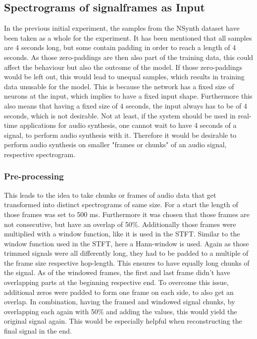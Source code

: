 \subsection{Spectrograms of signalframes as Input}
In the previous initial experiment, the samples from the NSynth dataset have been taken as a whole for the experiment. It has been mentioned that all samples are 4 seconds long, but some contain padding in order to reach a length of 4 seconds. As those zero-paddings are then also part of the training data, this could affect the behaviour but also the outcome of the model. If those zero-paddings would be left out, this would lead to unequal samples, which results in training data unusable for the model. This is because the network has a fixed size of neurons at the input, which implies to have a fixed input shape. Furthermore this also means that having a fixed size of 4 seconds, the input always has to be of 4 seconds, which is not desirable. Not at least, if the system should be used in real-time applications for audio synthesis, one cannot wait to have 4 seconds of a signal, to perform audio synthesis with it. Therefore it would be desirable to perform audio synthesis on smaller "frames or chunks" of an audio signal, respective spectrogram. 

\newpage
\subsubsection{Pre-processing}
This leads to the idea to take chunks or frames of audio data that get transformed into distinct spectrograms of same size. For a start the length of those frames was set to 500 ms. Furthermore it was chosen that those frames are not consecutive, but have an overlap of 50\%. Additionally those frames were multiplied with a window function, like it is used in the STFT. Similar to the window function used in the STFT, here a Hann-window is used. Again as those trimmed signals were all differently long, they had to be padded to a multiple of the frame size respective hop-length. This ensures to have equally long chunks of the signal. As of the windowed frames, the first and last frame didn't have overlapping parts at the beginning respective end. To overcome this issue, additional zeros were padded to form one frame on each side, to also get an overlap. In combination, having the framed and windowed signal chunks, by overlapping each again with 50\% and adding the values, this would yield the original signal again. This would be especially helpful when reconstructing the final signal in the end. 

